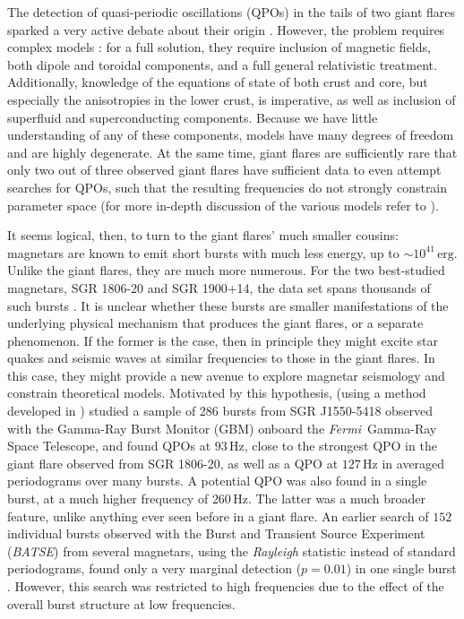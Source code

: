 \documentclass[numberedappendix]{emulateapj}
\newcommand{\hz}{\,\mathrm{Hz}}
\newcommand{\project}[1]{\textsl{#1}}
\newcommand{\fermi}{\project{Fermi}}
\begin{document}
The detection of quasi-periodic oscillations (QPOs) in the tails of two giant flares sparked a very active debate about their origin \citep{israel2005,strohmayer2005,strohmayer2006,watts2006}. However, the problem requires complex models \citep[for a general discussion, see ][]{watts2011}: for a full solution, they require inclusion of magnetic fields, both dipole and toroidal components, and a full general relativistic treatment. Additionally, knowledge of the equations of state of both crust and core, but especially the anisotropies in the lower crust, is imperative, as well as inclusion of superfluid and superconducting components. Because we have little understanding of any of these components, models have many degrees of freedom and are highly degenerate. At the same time, giant flares are sufficiently rare that only two out of three observed giant flares have sufficient data to even attempt searches for QPOs, such that the resulting frequencies do not strongly constrain parameter space (for more in-depth discussion of the various models refer to \citealp{samuelsson2007,andersson2009,sotani2007,sotani2008,vanhoven2008,vanhoven2011,vanhoven2012,colaiuda2011,colaiuda2012,gabler2011,gabler2012,gabler2013,passamonti2013a,passamonti2013b,lander2010,lander2011,glampedakis2006,glampedakis2014}).

It seems logical, then, to turn to the giant flares' much smaller cousins: magnetars are known to emit short bursts with much less energy, up to $\sim 10^{41} \, \mathrm{erg}$. Unlike the giant flares, they are much more numerous. For the two best-studied magnetars, SGR 1806-20 and SGR 1900+14, the data set spans thousands of such bursts \citep[e.g.][]{gogus1999,gogus2000,prieskorn2012}. It is unclear whether these bursts are smaller manifestations of the underlying physical mechanism that produces the giant flares, or a separate phenomenon. If the former is the case, then in principle they might excite star quakes and seismic waves at similar frequencies to those in the giant flares. In this case, they might provide a new avenue to explore magnetar seismology and constrain theoretical models. Motivated by this hypothesis,  \citet{huppenkothen2014} (using a method developed in \citet{huppenkothen2013}) studied a sample of 286 bursts from SGR J1550-5418 observed with the Gamma-Ray Burst Monitor (GBM) onboard the \fermi\ Gamma-Ray Space Telescope, and found QPOs at $93 \hz$, close to the strongest QPO in the giant flare observed from SGR 1806-20, as well as a QPO at $127\hz$ in averaged periodograms over many bursts. A potential QPO was also found in a single burst, at a much higher frequency of $260 \hz$. The latter was a much broader feature, unlike anything ever seen before in a giant flare.   An earlier search of $152$ individual bursts observed with the Burst and Transient Source Experiment (\project{BATSE}) from several magnetars, using the \textit{Rayleigh} statistic instead of standard periodograms, found only a very marginal detection ($p = 0.01$) in one single burst \cite{kruger2002}. However, this search was restricted to high frequencies due to the effect of the overall burst structure at low frequencies.
\end{document}
